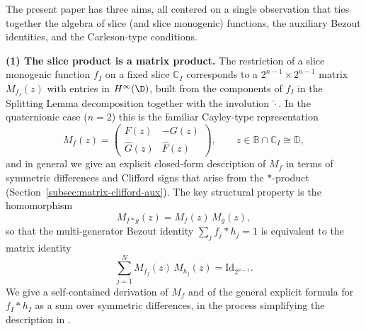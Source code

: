 \documentclass[11pt]{amsart}
\begin{document}
\medskip

The present paper has three aims, all centered on a single observation that ties together the algebra of slice (and slice monogenic) functions, the auxiliary Bezout identities, and the Carleson-type conditions.

\medskip
\noindent\textbf{(1) The slice product is a matrix product.}  The restriction of a slice monogenic function $f_I$ on a fixed slice $\mathbb{C}_I$ corresponds to a $2^{n-1}\times 2^{n-1}$ matrix $M_{f_I}(z)$ with entries in $H^\infty(\D)$, built from the components of $f_I$ in the Splitting Lemma decomposition together with the involution $\hat\cdot$.  In the quaternionic case ($n=2$) this is the familiar Cayley-type representation
\[
M_f(z)=\begin{pmatrix}F(z)&-G(z)\\ \hat G(z)&\hat F(z)\end{pmatrix},\qquad z\in\mathbb{B}\cap \mathbb{C}_I\cong\mathbb{D},
\]
and in general we give an explicit closed-form description of $M_f$ in terms of symmetric differences and Clifford signs that arise from the $\ast$-product (Section~\ref{subsec:matrix-clifford-aux}).  The key structural property is the homomorphism
\[
M_{f\ast g}(z)=M_f(z)\,M_g(z),
\]
so that the multi-generator Bezout identity $\sum_j f_j\ast h_j=1$ is equivalent to the matrix identity
\[
\sum_{j=1}^N M_{f_j}(z)\,M_{h_j}(z)=\mathrm{Id}_{2^{n-1}}.
\]
We give a self-contained derivation of $M_f$ and of the general explicit formula for $f_I\ast h_I$ as a sum over symmetric differences, in the process simplifying the description in \cite{MR2684426}.
\end{document}
